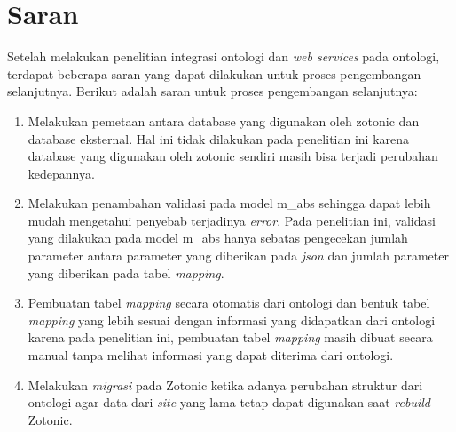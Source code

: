 \section{Saran}
Setelah melakukan penelitian integrasi ontologi dan \textit{web services} pada ontologi, terdapat beberapa saran yang dapat dilakukan untuk proses pengembangan selanjutnya. Berikut adalah saran untuk proses pengembangan selanjutnya:
\begin{enumerate}
	\item Melakukan pemetaan antara database yang digunakan oleh zotonic dan database eksternal. Hal ini tidak dilakukan pada penelitian ini karena database yang digunakan oleh zotonic sendiri masih bisa terjadi perubahan kedepannya.
	\item Melakukan penambahan validasi pada model m\_abs sehingga dapat lebih mudah mengetahui penyebab terjadinya \textit{error}. Pada penelitian ini, validasi yang dilakukan pada model m\_abs hanya sebatas pengecekan jumlah parameter antara parameter yang diberikan pada \textit{json} dan jumlah parameter yang diberikan pada tabel \textit{mapping}.
	\item Pembuatan tabel \textit{mapping} secara otomatis dari ontologi dan bentuk tabel \textit{mapping} yang lebih sesuai dengan informasi yang didapatkan dari ontologi karena pada penelitian ini, pembuatan tabel \textit{mapping} masih dibuat secara manual tanpa melihat informasi yang dapat diterima dari ontologi.
	\item Melakukan \textit{migrasi} pada Zotonic ketika adanya perubahan struktur dari ontologi agar data dari \textit{site} yang lama tetap dapat digunakan saat \textit{rebuild} Zotonic.
\end{enumerate}